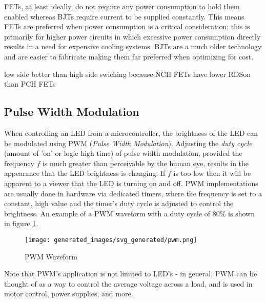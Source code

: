 \documentclass[main.tex]{subfiles}
\begin{document}

FETs, at least ideally, do not require any power consumption to hold them enabled whereas BJTs require current to be supplied constantly. This means FETs are preferred when power consumption is a critical consideration; this is primarily for higher power circuits in which excessive power consumption directly results in a need for expensive cooling systems. BJTs are a much older technology and are easier to fabricate making them far preferred when optimizing for cost.

low side better than high side swiching because NCH FETs have lower RDSon than PCH FETs 

\subsection{Pulse Width Modulation}
When controlling an LED from a microcontroller, the brightness of the LED can be modulated using PWM (\textit{Pulse Width Modulation}). Adjusting the \textit{duty cycle} (amount of 'on' or logic high time) of pulse width modulation, provided the frequency $f$ is much greater than perceivable by the human eye, results in the appearance that the LED brightness is changing. If $f$ is too low then it will be apparent to a viewer that the LED is turning on and off. PWM implementations are usually done in hardware via dedicated timers, where the frequency is set to a constant, high value and the timer's duty cycle is adjusted to control the brightness. An example of a PWM waveform with a duty cycle of 80\% is shown in figure \ref{fig:pwm_waveform}.

\begin{figure}[H]
    \centering
    \texttt{[image: generated\_images/svg\_generated/pwm.png]}
    \caption{PWM Waveform}
    \label{fig:pwm_waveform}
\end{figure}

\noindent Note that PWM's application is not limited to LED's - in general, PWM can be thought of as a way to control the average voltage across a load, and is used in motor control, power supplies, and more.
\end{document}
